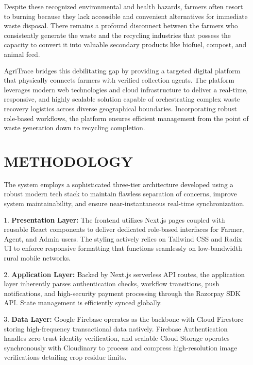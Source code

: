\documentclass[10pt,a4paper]{article}
\begin{document}
Despite these recognized environmental and health hazards, farmers often resort to burning because they lack accessible and convenient alternatives for immediate waste disposal. There remains a profound disconnect between the farmers who consistently generate the waste and the recycling industries that possess the capacity to convert it into valuable secondary products like biofuel, compost, and animal feed. 

AgriTrace bridges this debilitating gap by providing a targeted digital platform that physically connects farmers with verified collection agents. The platform leverages modern web technologies and cloud infrastructure to deliver a real-time, responsive, and highly scalable solution capable of orchestrating complex waste recovery logistics across diverse geographical boundaries. Incorporating robust role-based workflows, the platform ensures efficient management from the point of waste generation down to recycling completion.

\section{METHODOLOGY}
The system employs a sophisticated three-tier architecture developed using a robust modern tech stack to maintain flawless separation of concerns, improve system maintainability, and ensure near-instantaneous real-time synchronization.

1. \textbf{Presentation Layer:} The frontend utilizes Next.js pages coupled with reusable React components to deliver dedicated role-based interfaces for Farmer, Agent, and Admin users. The styling actively relies on Tailwind CSS and Radix UI to enforce responsive formatting that functions seamlessly on low-bandwidth rural mobile networks.

2. \textbf{Application Layer:} Backed by Next.js serverless API routes, the application layer inherently parses authentication checks, workflow transitions, push notifications, and high-security payment processing through the Razorpay SDK API. State management is efficiently synced globally.

3. \textbf{Data Layer:} Google Firebase operates as the backbone with Cloud Firestore storing high-frequency transactional data natively. Firebase Authentication handles zero-trust identity verification, and scalable Cloud Storage operates synchronously with Cloudinary to process and compress high-resolution image verifications detailing crop residue limits.
\end{document}
